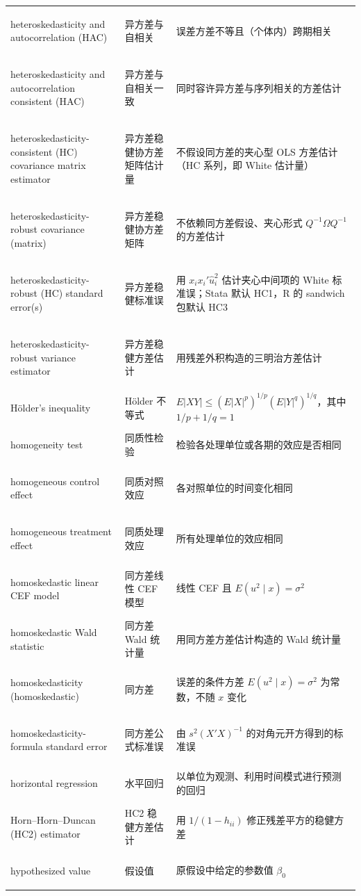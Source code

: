 \begin{longtable}{@{}>{\bfseries\boldmath\raggedright\arraybackslash}p{4.6cm}>{\raggedright\arraybackslash}p{3.2cm}>{\raggedright\arraybackslash}p{\dimexpr\textwidth-7.8cm-4\tabcolsep\relax}@{}}
heteroskedasticity and autocorrelation (HAC) & 异方差与自相关 & 误差方差不等且（个体内）跨期相关 \\
heteroskedasticity and autocorrelation consistent (HAC) & 异方差与自相关一致 & 同时容许异方差与序列相关的方差估计 \\
heteroskedasticity-consistent (HC) covariance matrix estimator & 异方差稳健协方差矩阵估计量 & 不假设同方差的夹心型 OLS 方差估计（HC 系列，即 White 估计量） \\
heteroskedasticity-robust covariance (matrix) & 异方差稳健协方差矩阵 & 不依赖同方差假设、夹心形式 $Q^{-1}\Omega Q^{-1}$ 的方差估计 \\
heteroskedasticity-robust (HC) standard error(s) & 异方差稳健标准误 & 用 $x_ix_i'\hat u_i^2$ 估计夹心中间项的 White 标准误；Stata 默认 HC1，R 的 sandwich 包默认 HC3 \\
heteroskedasticity-robust variance estimator & 异方差稳健方差估计 & 用残差外积构造的三明治方差估计 \\
Hölder's inequality & Hölder 不等式 & $E|XY|\le(E|X|^p)^{1/p}(E|Y|^q)^{1/q}$，其中 $1/p+1/q=1$ \\
homogeneity test & 同质性检验 & 检验各处理单位或各期的效应是否相同 \\
homogeneous control effect & 同质对照效应 & 各对照单位的时间变化相同 \\
homogeneous treatment effect & 同质处理效应 & 所有处理单位的效应相同 \\
homoskedastic linear CEF model & 同方差线性 CEF 模型 & 线性 CEF 且 $E(u^2\mid x)=\sigma^2$ \\
homoskedastic Wald statistic & 同方差 Wald 统计量 & 用同方差方差估计构造的 Wald 统计量 \\
homoskedasticity (homoskedastic) & 同方差 & 误差的条件方差 $E(u^2\mid x)=\sigma^2$ 为常数，不随 $x$ 变化 \\
homoskedasticity-formula standard error & 同方差公式标准误 & 由 $s^2(X'X)^{-1}$ 的对角元开方得到的标准误 \\
horizontal regression & 水平回归 & 以单位为观测、利用时间模式进行预测的回归 \\
Horn--Horn--Duncan (HC2) estimator & HC2 稳健方差估计 & 用 $1/(1-h_{ii})$ 修正残差平方的稳健方差 \\
hypothesized value & 假设值 & 原假设中给定的参数值 $\beta_0$ \\
\end{longtable}

\par{}\ifdim\dimexpr\pagegoal-\pagetotal\relax<16\baselineskip\newpage\fi
